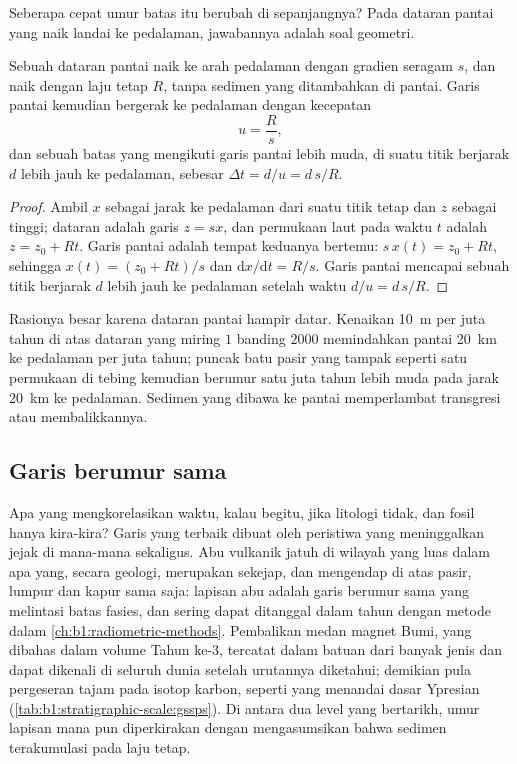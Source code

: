 Seberapa cepat umur batas itu berubah di sepanjangnya? Pada dataran pantai yang naik landai ke pedalaman, jawabannya adalah soal geometri.

\begin{proposition}\label{prop:b1:stratigraphic-scale:transgression}
Sebuah dataran pantai naik ke arah pedalaman dengan gradien seragam $s$, dan  naik dengan laju tetap $R$, tanpa sedimen yang ditambahkan di pantai. Garis pantai kemudian bergerak ke pedalaman dengan kecepatan
\[
  u = \frac{R}{s},
\]
dan sebuah batas yang mengikuti garis pantai lebih muda, di suatu titik berjarak $d$ lebih jauh ke pedalaman, sebesar $\Delta t = d/u = d\,s/R$.
\end{proposition}

\begin{proof}
Ambil $x$ sebagai jarak ke pedalaman dari suatu titik tetap dan $z$ sebagai tinggi; dataran adalah garis $z = s x$, dan permukaan laut pada waktu $t$ adalah
$z = z_0 + R t$. Garis pantai adalah tempat keduanya bertemu: $s\,x(t) = z_0 + R t$, sehingga
$x(t) = (z_0 + R t)/s$ dan $\mathrm dx/\mathrm dt = R/s$. Garis pantai mencapai sebuah titik berjarak $d$ lebih jauh ke pedalaman setelah waktu $d/u = d\,s/R$.
\end{proof}

Rasionya besar karena dataran pantai hampir datar. Kenaikan \qty{10}{m} per juta tahun di atas dataran yang miring $1$ banding $2000$ memindahkan pantai \qty{20}{km} ke pedalaman per juta tahun; puncak batu pasir yang tampak seperti satu permukaan di tebing kemudian berumur satu juta tahun lebih muda pada jarak \qty{20}{km} ke pedalaman. Sedimen yang dibawa ke pantai memperlambat transgresi atau membalikkannya.

\subsection*{Garis berumur sama}

Apa yang mengkorelasikan waktu, kalau begitu, jika litologi tidak, dan fosil hanya kira-kira? Garis yang terbaik dibuat oleh peristiwa yang meninggalkan jejak di mana-mana sekaligus. Abu vulkanik jatuh di wilayah yang luas dalam apa yang, secara geologi, merupakan sekejap, dan mengendap di atas pasir, lumpur dan kapur sama saja: lapisan abu adalah garis berumur sama yang melintasi batas fasies, dan sering dapat ditanggal dalam tahun dengan metode dalam \cref{ch:b1:radiometric-methods}. Pembalikan medan magnet Bumi, yang dibahas dalam volume Tahun ke-3, tercatat dalam batuan dari banyak jenis dan dapat dikenali di seluruh dunia setelah urutannya diketahui; demikian pula pergeseran tajam pada isotop karbon, seperti yang menandai dasar Ypresian (\cref{tab:b1:stratigraphic-scale:gssps}). Di antara dua level yang bertarikh, umur lapisan mana pun diperkirakan dengan mengasumsikan bahwa sedimen terakumulasi pada laju tetap.

